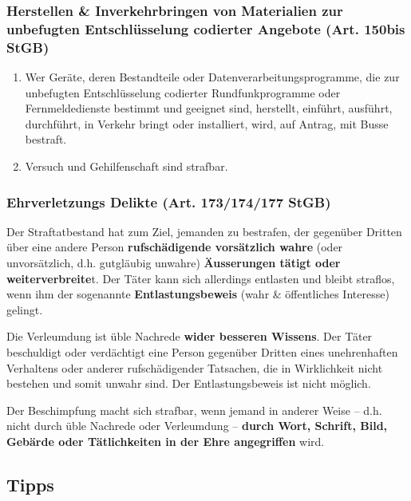 \subsubsection{Herstellen \& Inverkehrbringen von Materialien zur unbefugten
Entschlüsselung codierter Angebote (Art. 150bis StGB)}
\label{sec:CD-Herstellen}
\begin{enumerate}
	\tightlist
	\item Wer Geräte, deren Bestandteile oder Datenverarbeitungsprogramme,
	die zur unbefugten Entschlüsselung codierter
	Rundfunkprogramme oder Fernmeldedienste bestimmt und
	geeignet sind, herstellt, einführt, ausführt, durchführt, in
	Verkehr bringt oder installiert, wird, auf Antrag, mit Busse
	bestraft.
	\item Versuch und Gehilfenschaft sind strafbar.
\end{enumerate}

\subsubsection{Ehrverletzungs Delikte (Art. 173/174/177 StGB)}
\label{sec:CD-Ehrverletzung}
\begin{description}
	\tightlist
	\item[Üble Nachrede (Art. 173 StGB):] Der Straftatbestand hat zum Ziel,
	jemanden zu bestrafen, der gegenüber Dritten über eine andere Person
	\textbf{rufschädigende vorsätzlich wahre} (oder unvorsätzlich, d.h. gutgläubig
	unwahre) \textbf{Äusserungen tätigt oder weiterverbreite}t. Der Täter kann sich
	allerdings entlasten und bleibt straflos, wenn ihm der sogenannte
	\textbf{Entlastungsbeweis} (wahr \& öffentliches Interesse) gelingt.
	\item[Verleumdung (Art. 174 StGB)] Die Verleumdung ist üble Nachrede
	\textbf{wider besseren Wissens}. Der Täter beschuldigt oder verdächtigt eine
	Person gegenüber Dritten eines unehrenhaften Verhaltens oder anderer
	rufschädigender Tatsachen, die in Wirklichkeit nicht bestehen und somit
	unwahr sind. Der Entlastungsbeweis ist nicht möglich.
	\item[Beschimpfung (Art. 177 StGB)] Der Beschimpfung macht sich strafbar,
	wenn jemand in anderer Weise – d.h. nicht durch üble Nachrede oder
	Verleumdung – \textbf{durch Wort, Schrift, Bild, Gebärde oder Tätlichkeiten
	in der Ehre angegriffen} wird.
\end{description}

\subsection{Tipps}

